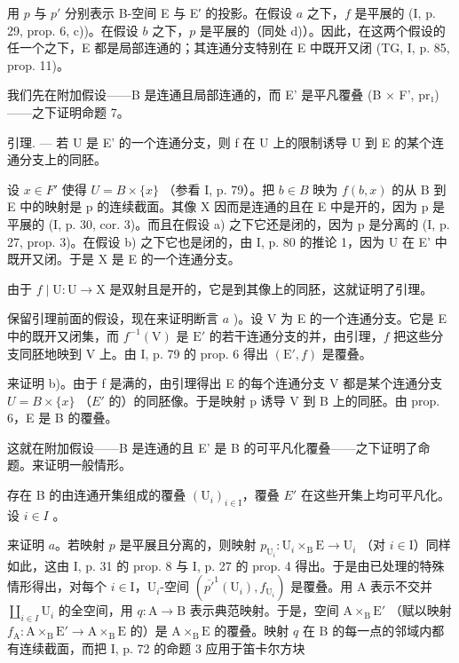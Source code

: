 用 \(p\) 与 \(p'\) 分别表示 B-空间 E 与 E′ 的投影。在假设 \(a\) 之下，\(f\) 是平展的 (I, p. 29, prop. 6, c))。在假设 \(b\) 之下，\(p\) 是平展的（同处 d)）。因此，在这两个假设的任一个之下，E 都是局部连通的；其连通分支特别在 E 中既开又闭 (TG, I, p. 85, prop. 11)。

我们先在附加假设——B 是连通且局部连通的，而 E' 是平凡覆叠 (B × F', pr₁)——之下证明命题 7。

引理. --- 若 U 是 E' 的一个连通分支，则 f 在 U 上的限制诱导 U 到 E 的某个连通分支上的同胚。

设 \(x \in F'\) 使得 \(U = B \times \{x\}\) （参看 I, p. 79）。把 \(b \in B\) 映为 \(f(b, x)\) 的从 B 到 E 中的映射是 p 的连续截面。其像 X 因而是连通的且在 E 中是开的，因为 p 是平展的 (I, p. 30, cor. 3)。而且在假设 a) 之下它还是闭的，因为 p 是分离的 (I, p. 27, prop. 3)。在假设 b) 之下它也是闭的，由 I, p. 80 的推论 1，因为 U 在 E' 中既开又闭。于是 X 是 E 的一个连通分支。

由于 \(f \mid \mathrm{U} \colon \mathrm{U} \to \mathrm{X}\) 是双射且是开的，它是到其像上的同胚，这就证明了引理。

保留引理前面的假设，现在来证明断言 \(a\) )。设 V 为 E 的一个连通分支。它是 E 中的既开又闭集，而 \(f^{-1}(\mathrm{V})\) 是 \(\mathrm{E}'\) 的若干连通分支的并，由引理，\(f\) 把这些分支同胚地映到 V 上。由 I, p. 79 的 prop. 6 得出 \((\mathrm{E}', f)\) 是覆叠。

来证明 b)。由于 f 是满的，由引理得出 E 的每个连通分支 V 都是某个连通分支 \(U = B \times \{x\}\) （\(E'\) 的）的同胚像。于是映射 p 诱导 V 到 B 上的同胚。由 prop. 6，E 是 B 的覆叠。

这就在附加假设——B 是连通的且 E' 是 B 的可平凡化覆叠——之下证明了命题。来证明一般情形。

存在 B 的由连通开集组成的覆叠 \((\mathrm{U}_{i})_{i\in\mathrm{I}}\)，覆叠 \(E'\) 在这些开集上均可平凡化。设 \(i\in I\) 。

来证明 \(a\)。若映射 \(p\) 是平展且分离的，则映射 \(p_{\mathrm{U}_i}\colon \mathrm{U}_i\times_{\mathrm{B}}\mathrm{E}\to \mathrm{U}_i\) （对 \(i\in \mathrm{I}\)）同样如此，这由 I, p. 31 的 prop. 8 与 I, p. 27 的 prop. 4 得出。于是由已处理的特殊情形得出，对每个 \(i\in \mathrm{I}\)，\(\mathrm{U}_i\)-空间 \((\overline{p'}^{1}(\mathrm{U}_i),f_{\mathrm{U}_i})\) 是覆叠。用 A 表示不交并 \(\coprod_{i\in I}\mathrm{U}_i\) 的全空间，用 \(q\colon \mathrm{A}\to \mathrm{B}\) 表示典范映射。于是，空间 \(\mathrm{A}\times_{\mathrm{B}}\mathrm{E}'\) （赋以映射 \(f_{\mathrm{A}}\colon \mathrm{A}\times_{\mathrm{B}}\mathrm{E}'\to \mathrm{A}\times_{\mathrm{B}}\mathrm{E}\) 的）是 \(\mathrm{A}\times_{\mathrm{B}}\mathrm{E}\) 的覆叠。映射 \(q\) 在 B 的每一点的邻域内都有连续截面，而把 I, p. 72 的命题 3 应用于笛卡尔方块

